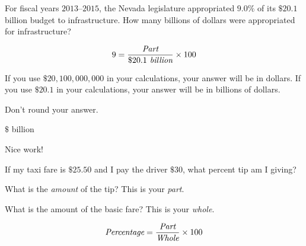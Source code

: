 \documentclass{ximera}
\begin{document}
\begin{question}
For fiscal years $2013$--$2015$, the Nevada legislature appropriated $9.0\%$ of its $\$20.1$ billion budget to infrastructure. How many billions of dollars were appropriated for infrastructure? 	

\begin{hint}
\begin{equation*}9=\frac{\emph{\text{Part}}}{\$20.1\emph{\text{ billion}}}\times 100\end{equation*}
\end{hint}
\begin{hint}
If you use $\$20,100,000,000$ in your calculations, your answer will be in dollars. If you use $\$20.1$ in your calculations, your answer will be in billions of dollars.
\end{hint}
\begin{hint}
Don't round your answer.
\end{hint}
$\$$ billion

Nice work!
\end{question}

\begin{question}
If my taxi fare is $\$25.50$ and I pay the driver $\$30$, what percent tip am I giving?

    \begin{multipleChoice}
    \end{multipleChoice}
    \begin{hint}
    What is the \emph{amount} of the tip? This is your \emph{part}.
    \end{hint}
    \begin{hint}
   What is the amount of the basic fare? This is your \emph{whole}.
    \end{hint}
  	\begin{hint}
    \begin{equation*}\emph{\text{Percentage}}=\frac{\emph{\text{Part}}}{\emph{\text{Whole}}}\times 100\end{equation*}
    \end{hint}

\end{question}
\end{document}
